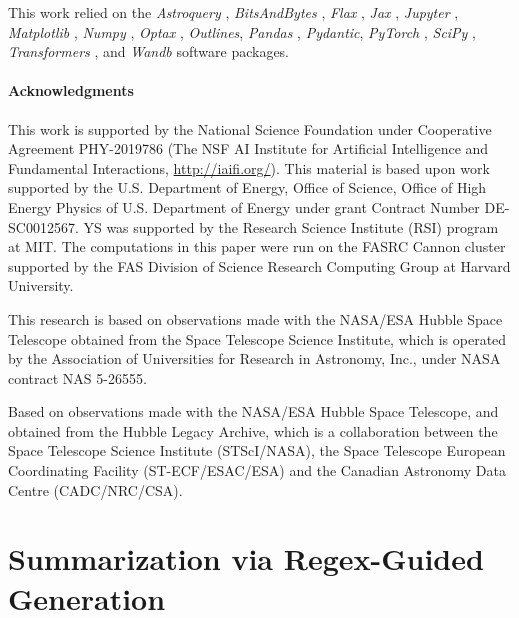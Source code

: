 \documentclass[10pt]{article} %
\newcommand{\package}[1]{\textsl{#1}\xspace}
\begin{document}
This work relied on the \package{Astroquery} \citep{2019AJ....157...98G}, \package{BitsAndBytes} \citep{dettmers2022llmint8}, \package{Flax} \citep{flax2020github}, \package{Jax} \citep{jax2018github}, \package{Jupyter} \citep{Kluyver2016jupyter}, \package{Matplotlib} \citep{Hunter:2007}, \package{Numpy} \citep{harris2020array}, \package{Optax} \citep{deepmind2020jax}, \package{Outlines}, \package{Pandas} \citep{2020SciPy-NMeth}, \package{Pydantic}, \package{PyTorch} \citep{paszke2019pytorch}, \package{SciPy} \citep{2020SciPy-NMeth}, \package{Transformers} \citep{wolf2019huggingface}, and \package{Wandb} \citep{wandb} software packages.



\paragraph*{Acknowledgments}

This work is supported by the National Science Foundation under Cooperative Agreement PHY-2019786 (The NSF AI Institute for Artificial Intelligence and Fundamental Interactions, \url{http://iaifi.org/}). This material is based upon work supported by the U.S. Department of Energy, Office of Science, Office of High Energy Physics of U.S. Department of Energy under grant Contract Number  DE-SC0012567. YS was supported by the Research Science Institute (RSI) program at MIT. The computations in this paper were run on the FASRC Cannon cluster supported by the FAS Division of Science Research Computing Group at Harvard University.

This research is based on observations made with the NASA/ESA Hubble Space Telescope obtained from the Space Telescope Science Institute, which is operated by the Association of Universities for Research in Astronomy, Inc., under NASA contract NAS 5-26555.

Based on observations made with the NASA/ESA Hubble Space Telescope, and obtained from the Hubble Legacy Archive, which is a collaboration between the Space Telescope Science Institute (STScI/NASA), the Space Telescope European Coordinating Facility (ST-ECF/ESAC/ESA) and the Canadian Astronomy Data Centre (CADC/NRC/CSA).





\appendix
\section{Summarization via Regex-Guided Generation}
\label{app:summarization}
\end{document}

